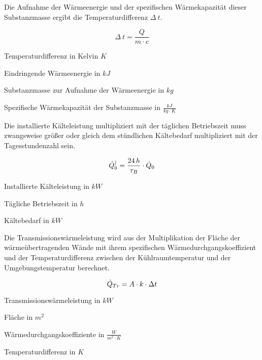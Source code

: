 Die Aufnahme der Wärmeenergie und der spezifischen Wärmekapazität dieser
Substanzmasse ergibt die Temperaturdifferenz $\Delta\:t$.

\begin{equation}
	\Delta\:t = \frac{Q}{m\cdot c}
\label{tdif}
\end{equation}

\begin{description}[\dth]

	\item[$\Delta\:t$] Temperaturdifferenz in Kelvin $K$
	\item[$Q$] Eindringende Wärmeenergie in $kJ$
	\item[$m$] Substanzmasse zur Aufnahme der Wärmeenergie in $kg$
	\item[$c$] Spezifische Wärmekapazität der Substanzmasse in $\frac{kJ}{kg
		\cdot K}$

\end{description}
\vspace{0.5cm}

Die installierte Kälteleistung multipliziert mit der täglichen Betriebszeit muss
zwangsweise größer oder gleich dem stündlichen Kältebedarf multipliziert mit der
Tagesstundenzahl sein.

\begin{equation}
	\pinstall = \frac{24\,h}{ \tau_{B} }  \cdot \pkalt \label{pinstall}
\end{equation}

\begin{description}[\dth]

	\item[$\pinstall$] Installierte Kälteleistung in $kW$
	\item[$\tau_{B}$] Tägliche Betriebszeit in $h$
	\item[$\pkalt$] Kältebedarf in $kW$

\end{description}
\vspace{0.5cm}

Die Transmissionswärmeleistung wird aus der Multiplikation der Fläche
der wärmeübertragenden Wände mit ihrem spezifischen Wärmedurchgangskoeffizient
und der Temperaturdifferenz zwischen der Kühlraumtemperatur und der
Umgebungstemperatur berechnet.

\begin{equation}
	\ptrans = A \cdot k \cdot \Delta t
	\label{ptrans}
\end{equation}

\begin{description}[\dth]

	\item[$\ptrans$] Transmissionswärmeleistung in $kW$
	\item[$A$] Fläche in $m^2$
	\item[$k$] Wärmedurchgangskoeffiziente in $\frac{W}{m^2 \cdot K}$
	\item[$\Delta\: t$] Temperaturdifferenz in $K$

\end{description}
\vspace{0.5cm}

